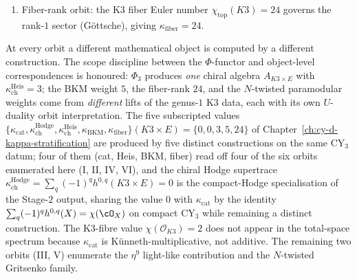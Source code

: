 \begin{remark}
\begin{enumerate}[label=\textup{(\Roman*)}]
\item \textup{Fiber-rank orbit:} the K3 fiber Euler number $\chi_{\mathrm{top}}(K3) = 24$ governs the rank-$1$ sector (G\"ottsche), giving $\kappa_{\mathrm{fiber}} = 24$.
\end{enumerate}
At every orbit a different mathematical object is computed by a different construction. The scope discipline between the $\Phi$-functor and object-level correspondences is honoured: $\Phi_3$ produces \emph{one} chiral algebra $A_{K3\times E}$ with $\kappa_{\mathrm{ch}}^{\mathrm{Heis}} = 3$; the BKM weight $5$, the fiber-rank $24$, and the $N$-twisted paramodular weights come from \emph{different} lifts of the genus-$1$ K3 data, each with its own $U$-duality orbit interpretation. The five subscripted values $\{\kappa_{\mathrm{cat}}, \kappa_{\mathrm{ch}}^{\mathrm{Hodge}}, \kappa_{\mathrm{ch}}^{\mathrm{Heis}}, \kappa_{\mathrm{BKM}}, \kappa_{\mathrm{fiber}}\}(K3 \times E) = \{0, 0, 3, 5, 24\}$ of Chapter~\ref{ch:cy-d-kappa-stratification} are produced by five distinct constructions on the same CY$_3$ datum; four of them (cat, Heis, BKM, fiber) read off four of the six orbits enumerated here (I, II, IV, VI), and the chiral Hodge supertrace $\kappa_{\mathrm{ch}}^{\mathrm{Hodge}} = \sum_q (-1)^q h^{0, q}(K3 \times E) = 0$ is the compact-Hodge specialisation of the Stage-$2$ output, sharing the value $0$ with $\kappa_{\mathrm{cat}}$ by the identity $\sum_q (-1)^q h^{0, q}(X) = \chi(\cO_X)$ on compact CY$_3$ while remaining a distinct construction. The K3-fibre value $\chi(\mathcal{O}_{K3}) = 2$ does not appear in the total-space spectrum because $\kappa_{\mathrm{cat}}$ is K\"unneth-multiplicative, not additive. The remaining two orbits (III, V) enumerate the $\eta^{9}$ light-like contribution and the $N$-twisted Gritsenko family.
\end{remark}

